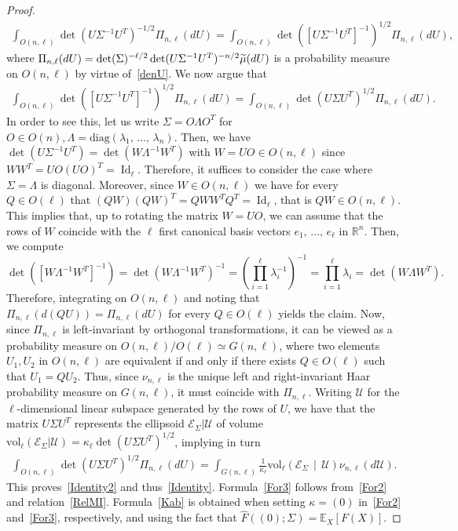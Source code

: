 \documentclass[10pt]{amsart}
\theoremstyle{definition}\newtheorem{defi}[theo]{Definition}\newtheorem{rema}[theo]{Remark}\newtheorem{exam}[theo]{Example}\newtheorem{exem}[theo]{Example}\newtheorem{nota}[theo]{Notation}
\DeclareMathOperator{\Id}{Id}
\newcommand{\scU}{\mathscr{U}}
\newcommand{\diag}{\mathrm{diag}}
\newcommand{\rvol}{\mathrm{vol}}
\newcommand{\clE}{\mathcal{E}}
\newcommand{\R}{\mathbb{R}}
\newcommand{\EX}[2]{\mathbb{E}_{#1}\left[#2\right]}
\let\oldtilde\tilde
\renewcommand*{\tilde}[1]{\mathchoice{\widetilde{#1}}{\widetilde{#1}}{\oldtilde{#1}}{\oldtilde{#1}}}
\begin{document}
\begin{proof}
\begin{gather*}
\int_{O(n,\ell)} \det\left(U\Sigma^{-1}U^T\right)^{-1/2} \Pi_{n,\ell}(dU) = \int_{O(n,\ell)} \det\left(\left[U\Sigma^{-1}U^T\right]^{-1}\right)^{1/2} \Pi_{n,\ell}(dU),
\end{gather*}
where $\Pi_{n,\ell}(dU)= \det(\Sigma)^{-\ell/2} \det(U\Sigma^{-1}U^T)^{-n/2}\tilde{\mu}(dU) $ is a probability measure on $O(n,\ell)$ by virtue of~\eqref{denU}. We now argue that
\begin{gather*}
\int_{O(n,\ell)} \det\left(\left[U\Sigma^{-1}U^T\right]^{-1}\right)^{1/2} \Pi_{n,\ell}(dU) = \int_{O(n,\ell)} \det\left(U \Sigma U^T\right)^{1/2} \Pi_{n,\ell}(dU).
\end{gather*}
In order to see this, let us write $\Sigma = O \Lambda O^T$ for $O \in O(n), \Lambda=\diag(\lambda_1,\,\ldots,\,\lambda_n)$. Then, we have $\det(U\Sigma^{-1}U^T) = \det(W \Lambda^{-1} W^T) $ with $W=UO \in O(n,\ell)$ since $WW^T = UO(UO)^T= \Id_{\ell}$. Therefore, it suffices to consider the case where $\Sigma=\Lambda$ is diagonal. Moreover, since $W \in O(n,\ell)$ we have for every $Q\in O(\ell)$ that $(QW)(QW)^T=QWW^TQ^T=\Id_{\ell}$, that is $QW \in O(n,\ell)$. This implies that, up to rotating the matrix $W=UO$, we can assume that the rows of $W$ coincide with the $\ell$ first canonical basis vectors $e_1,\,\ldots,\,e_{\ell}$ in $\R^n$. Then, we compute
\[
\det\left(\left[W \Lambda^{-1} W^T\right]^{-1}\right) = \det\left(W\Lambda^{-1} W^T\right)^{-1} = \left(\prod_{i=1}^{\ell}\lambda_i^{-1}\right)^{-1} = \prod_{i=1}^{\ell}\lambda_i = \det\left(W\Lambda W^T\right).
\]
Therefore, integrating on $O(n,\ell)$ and noting that $\Pi_{n,\ell}(d(QU))=\Pi_{n,\ell}(dU)$ for every $Q \in O(\ell)$ yields the claim. Now, since $\Pi_{n,\ell}$ is left-invariant by orthogonal transformations, it can be viewed as a probability measure on $O(n,\ell)/O(\ell) \simeq G(n,\ell)$, where two elements $U_1,U_2$ in $O(n,\ell)$ are equivalent if and only if there exists $Q\in O(\ell)$ such that $U_1=QU_2$. Thus, since $\nu_{n,\ell}$ is the unique left and right-invariant Haar probability measure on $G(n,\ell)$, it must coincide with $\Pi_{n,\ell}$. Writing $\scU$ for the $\ell$-dimensional linear subspace generated by the rows of $U$, we have that the matrix $U\Sigma U^T$ represents the ellipsoid $\clE_{\Sigma}|\scU$ of volume $\rvol_{\ell}(\clE_{\Sigma}|\scU)=\kappa_{\ell}\det(U\Sigma U^T)^{1/2}$, implying in turn
\begin{gather*}
\int_{O(n,\ell)} \det\left(U \Sigma U^T\right)^{1/2} \Pi_{n,\ell}(dU) = \int_{G(n,\ell)} \frac{1}{\kappa_{\ell}} \rvol_{\ell}\left(\clE_{\Sigma}\,\middle|\,\scU\right) \nu_{n,\ell}(d\scU).
\end{gather*}
This proves~\eqref{Identity2} and thus~\eqref{Identity}. Formula~\eqref{For3} follows from~\eqref{For2} and relation~\eqref{RelMI}. Formula~\eqref{Kab} is obtained when setting $\kappa=(0)$ in~\eqref{For2} and~\eqref{For3}, respectively, and using the fact that $\widehat{F}((0);\Sigma)=\EX{X}{F(X)}$.
\end{proof}
\end{document}
